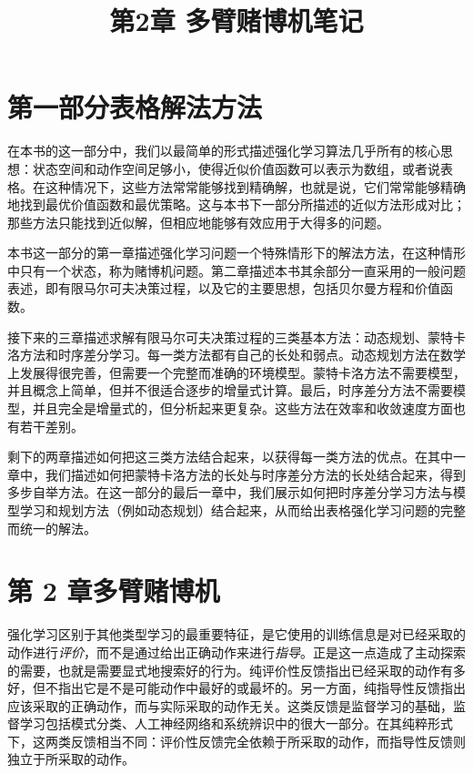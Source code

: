 \documentclass[UTF8,12pt,a4paper,fontset=fandol]{ctexart}
\title{第2章 多臂赌博机笔记}
\author{}
\date{}
\begin{document}
\maketitle

\section*{第一部分\quad 表格解法方法}

在本书的这一部分中，我们以最简单的形式描述强化学习算法几乎所有的核心思想：状态空间和动作空间足够小，使得近似价值函数可以表示为数组，或者说表格。在这种情况下，这些方法常常能够找到精确解，也就是说，它们常常能够精确地找到最优价值函数和最优策略。这与本书下一部分所描述的近似方法形成对比；那些方法只能找到近似解，但相应地能够有效应用于大得多的问题。

本书这一部分的第一章描述强化学习问题一个特殊情形下的解法方法，在这种情形中只有一个状态，称为赌博机问题。第二章描述本书其余部分一直采用的一般问题表述，即有限马尔可夫决策过程，以及它的主要思想，包括贝尔曼方程和价值函数。

接下来的三章描述求解有限马尔可夫决策过程的三类基本方法：动态规划、蒙特卡洛方法和时序差分学习。每一类方法都有自己的长处和弱点。动态规划方法在数学上发展得很完善，但需要一个完整而准确的环境模型。蒙特卡洛方法不需要模型，并且概念上简单，但并不很适合逐步的增量式计算。最后，时序差分方法不需要模型，并且完全是增量式的，但分析起来更复杂。这些方法在效率和收敛速度方面也有若干差别。

剩下的两章描述如何把这三类方法结合起来，以获得每一类方法的优点。在其中一章中，我们描述如何把蒙特卡洛方法的长处与时序差分方法的长处结合起来，得到多步自举方法。在这一部分的最后一章中，我们展示如何把时序差分学习方法与模型学习和规划方法（例如动态规划）结合起来，从而给出表格强化学习问题的完整而统一的解法。

\section*{第 2 章\quad 多臂赌博机}

强化学习区别于其他类型学习的最重要特征，是它使用的训练信息是对已经采取的动作进行\textit{评价}，而不是通过给出正确动作来进行\textit{指导}。正是这一点造成了主动探索的需要，也就是需要显式地搜索好的行为。纯评价性反馈指出已经采取的动作有多好，但不指出它是不是可能动作中最好的或最坏的。另一方面，纯指导性反馈指出应该采取的正确动作，而与实际采取的动作无关。这类反馈是监督学习的基础，监督学习包括模式分类、人工神经网络和系统辨识中的很大一部分。在其纯粹形式下，这两类反馈相当不同：评价性反馈完全依赖于所采取的动作，而指导性反馈则独立于所采取的动作。
\end{document}
